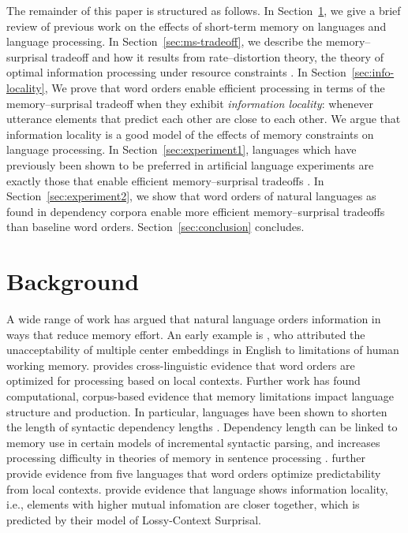 \documentclass[11pt,letterpaper]{article}
\begin{document}
The remainder of this paper is structured as follows. In Section~\ref{sec:background}, we give a brief review of previous work on the effects of short-term memory on languages and language processing. In Section~\ref{sec:ms-tradeoff}, we describe the memory--surprisal tradeoff and how it results from rate--distortion theory, the theory of optimal information processing under resource constraints \citep{cover2006elements}. In Section~\ref{sec:info-locality}, We prove that word orders enable efficient processing in terms of the memory--surprisal tradeoff when they exhibit \emph{information locality}: whenever utterance elements that predict each other are close to each other. We argue that information locality is a good model of the effects of memory constraints on language processing. In Section~\ref{sec:experiment1}, languages which have previously been shown to be preferred in artificial language experiments are exactly those that enable efficient memory--surprisal tradeoffs \citep{fedzechkina2017human}. In Section~\ref{sec:experiment2}, we show that word orders of natural languages as found in dependency corpora \citep{ud} enable more efficient memory--surprisal tradeoffs than baseline word orders. Section~\ref{sec:conclusion} concludes.



\section{Background}
\label{sec:background}

A wide range of work has argued that natural language orders information in ways that reduce memory effort.
An early example is \cite{miller-finitary-1963}, who attributed the unacceptability of multiple center embeddings in English to limitations of human working memory.
\cite{hawkins-efficiency-2003} provides cross-linguistic evidence that word orders are optimized for processing based on local contexts.
Further work has found computational, corpus-based evidence that memory limitations impact language structure and production.
In particular, languages have been shown to shorten the length of syntactic dependency lengths \citep{futrell-large-scale-2015}.
Dependency length can be linked to memory use in certain models of incremental syntactic parsing, and increases processing difficulty in theories of memory in sentence processing \citep{gibson-linguistic-1998}.
\cite{gildea-human-2015} further provide evidence from five languages that word orders optimize predictability from local contexts.
\cite{futrell-noisy-context-2017} provide evidence that language shows information locality, i.e., elements with higher mutual infomation are closer together, which is predicted by their model of Lossy-Context Surprisal.
\end{document}
